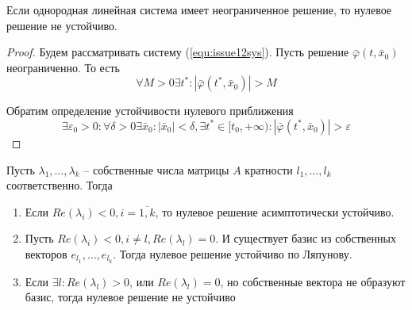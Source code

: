 \documentclass[a4paper, 12pt]{article}
\begin{document}
	\begin{lemma}
		Если однородная линейная система имеет неограниченное решение, то нулевое решение не устойчиво.
	\end{lemma}

	\begin{proof}
		Будем рассматривать систему (\ref{equ:issue12sys}). Пусть решение $\bar{\varphi}(t, \bar{x}_0)$ неограниченно. То есть 
		\[
			\forall M>0 \exists t^*:|\bar{\varphi}(t^*, \bar{x}_0)|>M
		\]
		
		Обратим определение устойчивости нулевого приближения 
		\[
			\exists \varepsilon_0>0: \forall \delta>0 \exists \bar{x}_0: |\bar{x}_0|<\delta, \exists t^*\in[t_0, +\infty): |\bar{\varphi}(t^*, \bar{x}_0)|>\varepsilon
		\]
	\end{proof}
	
	\begin{theorem}
		Пусть $\lambda_1, \dots, \lambda_k$ -- собственные числа матрицы $A$ кратности $l_1, \dots, l_k$ соответственно. Тогда
		\begin{enumerate}
			\item Если $Re(\lambda_i)<0, i=\overline{1, k}$, то нулевое решение асимптотически устойчиво.
			\item Пусть $Re(\lambda_i)<0, i\neq l, Re(\lambda_l)=0$. И существует базис из собственных векторов $e_{l_1}, \dots, e_{l_k}$. Тогда нулевое решение устойчиво по Ляпунову.
			\item Если $\exists l: Re(\lambda_l) > 0$, или $Re(\lambda_l) = 0$, но собственные вектора не образуют базис, тогда нулевое решение не устойчиво
		\end{enumerate}
	\end{theorem}
	
\end{document}
